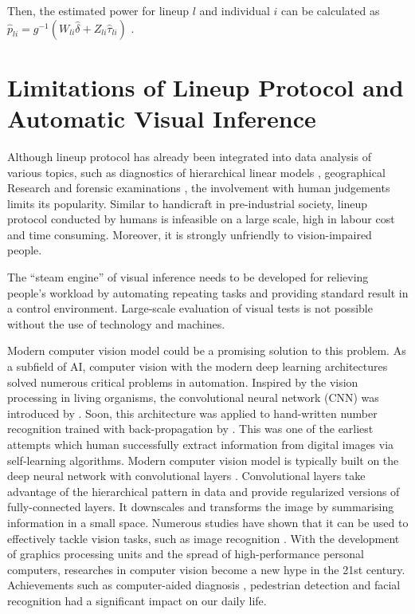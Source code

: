 \documentclass{monashthesis}
\theoremstyle{definition}
\theoremstyle{definition}
\theoremstyle{definition}
\theoremstyle{definition}
\theoremstyle{remark}
\begin{document}
Then, the estimated power for lineup \(l\) and individual \(i\) can be calculated as \(\hat{p}_{li} = g^{-1}(W_{li}\hat{\delta} + Z_{li}\hat{\tau}_{li})\) \autocite{majumder_validation_2013}.

\hypertarget{se:limitation}{%
\section{Limitations of Lineup Protocol and Automatic Visual Inference}\label{se:limitation}}

Although lineup protocol has already been integrated into data analysis of various topics, such as diagnostics of hierarchical linear models \autocite{loy_diagnostic_2013}, geographical Research \autocite{widen_graphical_2016} and forensic examinations \autocite{krishnan_hierarchical_2021}, the involvement with human judgements limits its popularity. Similar to handicraft in pre-industrial society, lineup protocol conducted by humans is infeasible on a large scale, high in labour cost and time consuming. Moreover, it is strongly unfriendly to vision-impaired people.

The ``steam engine'' of visual inference needs to be developed for relieving people's workload by automating repeating tasks and providing standard result in a control environment. Large-scale evaluation of visual tests is not possible without the use of technology and machines.

Modern computer vision model could be a promising solution to this problem. As a subfield of AI, computer vision with the modern deep learning architectures solved numerous critical problems in automation. Inspired by the vision processing in living organisms, the convolutional neural network (CNN) was introduced by \textcite{fukushima_neocognitron_1982}. Soon, this architecture was applied to hand-written number recognition trained with back-propagation by \textcite{lecun_backpropagation_1989}. This was one of the earliest attempts which human successfully extract information from digital images via self-learning algorithms. Modern computer vision model is typically built on the deep neural network with convolutional layers \autocite{fukushima_neocognitron_1982}. Convolutional layers take advantage of the hierarchical pattern in data and provide regularized versions of fully-connected layers. It downscales and transforms the image by summarising information in a small space. Numerous studies have shown that it can be used to effectively tackle vision tasks, such as image recognition \autocite{rawat_deep_2017}. With the development of graphics processing units and the spread of high-performance personal computers, researches in computer vision become a new hype in the 21st century. Achievements such as computer-aided diagnosis \autocite{lee_image_2015}, pedestrian detection \autocite{brunetti_computer_2018} and facial recognition \autocite{emami_facial_2012} had a significant impact on our daily life.
\end{document}
